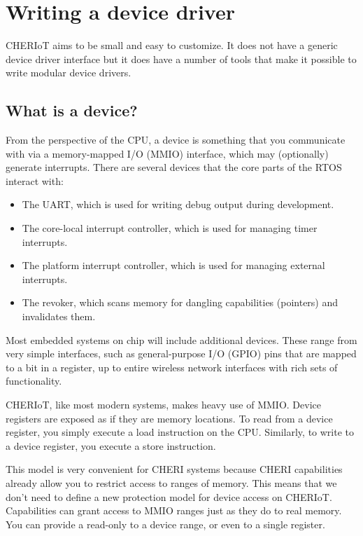 \chapter[label=drivers]{Writing a device driver}

CHERIoT aims to be small and easy to customize.
It does not have a generic device driver interface but it does have a number of tools that make it possible to write modular device drivers.

\section{What is a device?}

From the perspective of the CPU, a device is something that you communicate with via a memory-mapped I/O (MMIO) interface, which may (optionally) generate interrupts.
There are several devices that the core parts of the RTOS interact with:

\begin{itemize}
	\item{The UART, which is used for writing debug output during development.}
	\item{The core-local interrupt controller, which is used for managing timer interrupts.}
	\item{The platform interrupt controller, which is used for managing external interrupts.}
	\item{The revoker, which scans memory for dangling capabilities (pointers) and invalidates them.}
\end{itemize}

Most embedded systems on chip will include additional devices.
These range from very simple interfaces, such as general-purpose I/O (GPIO) pins that are mapped to a bit in a register, up to entire wireless network interfaces with rich sets of functionality.

CHERIoT, like most modern systems, makes heavy use of MMIO.
Device registers are exposed as if they are memory locations.
To read from a device register, you simply execute a load instruction on the CPU.
Similarly, to write to a device register, you execute a store instruction.

This model is very convenient for CHERI systems because CHERI capabilities already allow you to restrict access to ranges of memory.
This means that we don't need to define a new protection model for device access on CHERIoT.
Capabilities can grant access to MMIO ranges just as they do to real memory.
You can provide a read-only to a device range, or even to a single register.


